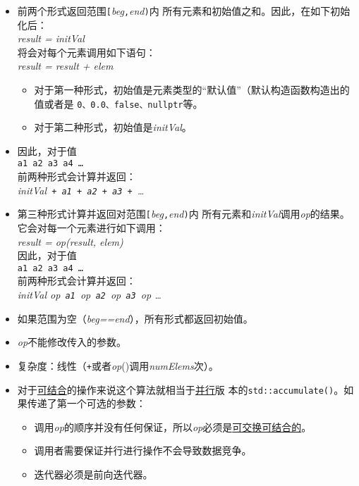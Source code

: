 \begin{itemize}
    \item 前两个形式返回范围\texttt{[}\emph{beg}\texttt{,}\emph{end}\texttt{)}内
    所有元素和初始值之和。因此，在如下初始化后：\\
    \hspace*{2em}\emph{result = initVal}\\
    将会对每个元素调用如下语句：\\
    \hspace*{2em}\emph{result = result + elem}
    \begin{itemize}
        \item 对于第一种形式，初始值是元素类型的“默认值”（默认构造函数构造出的值或者是
        \texttt{0、0.0、false、nullptr}等。
        \item 对于第二种形式，初始值是\emph{initVal}。
    \end{itemize}
    \item 因此，对于值\\
    \hspace*{2em}\texttt{a1 a2 a3 a4 \ldots}\\
    前两种形式会计算并返回：\\
    \hspace*{2em}\emph{initVal\texttt{ + a1 + a2 + a3 + }\ldots}
    \item 第三种形式计算并返回对范围\texttt{[}\emph{beg}\texttt{,}\emph{end}\texttt{)}内
    所有元素和\emph{initVal}调用\emph{op}的结果。它会对每一个元素进行如下调用：\\
    \hspace*{2em}\emph{result = op(result, elem)}\\
    因此，对于值\\
    \hspace*{2em}\texttt{a1 a2 a3 a4 \ldots}\\
    前两种形式会计算并返回：\\
    \hspace*{2em}\emph{initVal op\texttt{ a1 }op\texttt{ a2 }op\texttt{ a3 }op \ldots}
    \item 如果范围为空（\emph{beg==end}），所有形式都返回初始值。
    \item \emph{op}不能修改传入的参数。
    \item 复杂度：线性（\texttt{+}或者\emph{op}()调用\emph{numElems}次）。
    \item 对于\hyperref[ch22.6.1.1]{可结合}的操作来说这个算法就相当于\hyperref[ch22]{并行}版
    本的\texttt{std::accumulate()}。如果传递了第一个可选的参数：
    \begin{itemize}
        \item 调用\emph{op}的顺序并没有任何保证，所以\emph{op}必须是\hyperref[ch22.6.1.1]{可交换可结合的}。
        \item 调用者需要保证并行进行操作不会导致数据竞争。
        \item 迭代器必须是前向迭代器。
    \end{itemize}
\end{itemize}

